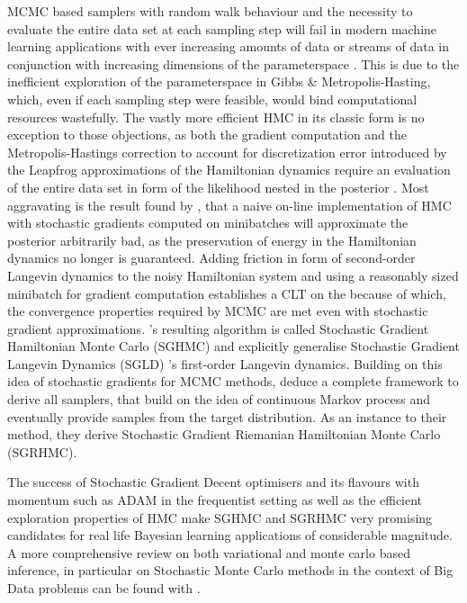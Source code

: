 \documentclass[11pt]{article}
\begin{document}
    MCMC based samplers with random walk behaviour and the necessity to evaluate the entire data set at each sampling step will fail in modern machine learning applications with ever increasing amounts of data or streams of data in conjunction with increasing dimensions of the parameterspace . This is due to the inefficient exploration of the parameterspace in Gibbs \& Metropolis-Hasting, which, even if each sampling step were feasible, would bind computational resources wastefully.
    The vastly more efficient HMC in its classic form is no exception to those objections, as both the gradient computation and the Metropolis-Hastings correction to account for discretization error introduced by the Leapfrog approximations of the Hamiltonian dynamics require an evaluation of the entire data set in form of the likelihood nested in the posterior \citep{zhu2017big}.
    Most aggravating is the result found by \citep{chen2014stochastic}, that a naive on-line implementation of HMC with stochastic gradients computed on minibatches will approximate the posterior arbitrarily bad, as the preservation of energy in the Hamiltonian dynamics no longer is guaranteed. Adding friction in form of second-order Langevin dynamics to the noisy Hamiltonian system and using a reasonably sized minibatch for gradient computation establishes a CLT on the because of which, the convergence properties required by MCMC are met even with stochastic gradient approximations. \citep{chen2014stochastic}'s resulting algorithm is called Stochastic Gradient Hamiltonian Monte Carlo (SGHMC) and explicitly generalise Stochastic Gradient Langevin Dynamics (SGLD) \citep{welling2011bayesian}'s first-order Langevin dynamics.
    Building on this idea of stochastic gradients for MCMC methods, \citep{ma2015complete} deduce a complete framework to derive all samplers, that build on the idea of continuous Markov process and eventually provide samples from the target distribution. As an instance to their method, they derive Stochastic Gradient Riemanian Hamiltonian Monte Carlo (SGRHMC).



    The success of Stochastic Gradient Decent optimisers and its flavours with momentum such as ADAM \citep{ADAM} in the frequentist setting  as well as the efficient exploration properties of HMC make SGHMC and SGRHMC very promising candidates for real life Bayesian learning applications of considerable magnitude.
    A more comprehensive review on both variational and monte carlo based inference, in particular on Stochastic Monte Carlo methods in the context of Big Data problems can be found with \citep{zhu2017big}.
\end{document}
